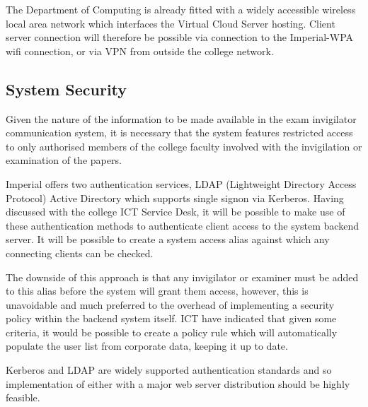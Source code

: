 The Department of Computing is already fitted with a widely accessible wireless local area network which interfaces the Virtual Cloud Server hosting.  Client server connection will therefore be possible via connection to the Imperial-WPA wifi connection, or via VPN from outside the college network.

\subsection{System Security}

Given the nature of the information to be made available in the exam invigilator communication system, it is necessary that the system features restricted access to only authorised members of the college faculty involved with the invigilation or examination of the papers.

Imperial offers two authentication services, LDAP (Lightweight Directory Access Protocol) Active Directory which supports single signon via Kerberos.  Having discussed with the college ICT Service Desk, it will be possible to make use of these authentication methods to authenticate client access to the system backend server.  It will be possible to create a system access alias against which any connecting clients can be checked.

The downside of this approach is that any invigilator or examiner must be added to this alias before the system will grant them access, however, this is unavoidable and much preferred to the overhead of implementing a security policy within the backend system itself.  ICT have indicated that given some criteria, it would be possible to create a policy rule which will automatically populate the user list from corporate data, keeping it up to date.

Kerberos and LDAP are widely supported authentication standards and so implementation of either with a major web server distribution should be highly feasible.